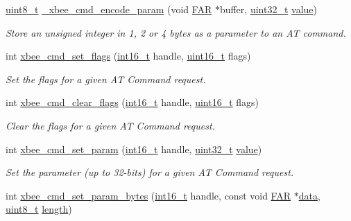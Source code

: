 \begin{DoxyCompactItemize}
\hyperlink{group__hal_gae1affc9ca37cfb624959c866a73f83c2}{uint8\-\_\-t} \hyperlink{group__xbee__atcmd_ga484572705b9695ab429fd51188f74238}{\-\_\-xbee\-\_\-cmd\-\_\-encode\-\_\-param} (void \hyperlink{group__hal_gaef060b3456fdcc093a7210a762d5f2ed}{F\-A\-R} $\ast$buffer, \hyperlink{group__hal__dos_ga09a1e304d66d35dd47daffee9731edaa}{uint32\-\_\-t} \hyperlink{group__zcl_ga1ed5b151a90f7e99af8cca2e6875ddf4}{value})
\begin{DoxyCompactList}\small\item\em Store an unsigned integer in 1, 2 or 4 bytes as a parameter to an A\-T command. \end{DoxyCompactList}\item 
int \hyperlink{group__xbee__atcmd_gad2cc44803cc53ada37df4557313e120b}{xbee\-\_\-cmd\-\_\-set\-\_\-flags} (\hyperlink{group__hal_ga2140805d08462d474b82ddc8d1c2f3e6}{int16\-\_\-t} handle, \hyperlink{group__hal_ga5a8b2dc9e45a9ee81a94ef304fb62505}{uint16\-\_\-t} flags)
\begin{DoxyCompactList}\small\item\em Set the flags for a given A\-T Command request. \end{DoxyCompactList}\item 
int \hyperlink{group__xbee__atcmd_ga0828601d6b2735ee9f2ebf408d12c05c}{xbee\-\_\-cmd\-\_\-clear\-\_\-flags} (\hyperlink{group__hal_ga2140805d08462d474b82ddc8d1c2f3e6}{int16\-\_\-t} handle, \hyperlink{group__hal_ga5a8b2dc9e45a9ee81a94ef304fb62505}{uint16\-\_\-t} flags)
\begin{DoxyCompactList}\small\item\em Clear the flags for a given A\-T Command request. \end{DoxyCompactList}\item 
int \hyperlink{group__xbee__atcmd_ga4295dde3673b07f41e569e333abd9730}{xbee\-\_\-cmd\-\_\-set\-\_\-param} (\hyperlink{group__hal_ga2140805d08462d474b82ddc8d1c2f3e6}{int16\-\_\-t} handle, \hyperlink{group__hal__dos_ga09a1e304d66d35dd47daffee9731edaa}{uint32\-\_\-t} \hyperlink{group__zcl_ga1ed5b151a90f7e99af8cca2e6875ddf4}{value})
\begin{DoxyCompactList}\small\item\em Set the parameter (up to 32-\/bits) for a given A\-T Command request. \end{DoxyCompactList}\item 
int \hyperlink{group__xbee__atcmd_ga6bd558a2d03eafe29b176f598d76ffd6}{xbee\-\_\-cmd\-\_\-set\-\_\-param\-\_\-bytes} (\hyperlink{group__hal_ga2140805d08462d474b82ddc8d1c2f3e6}{int16\-\_\-t} handle, const void \hyperlink{group__hal_gaef060b3456fdcc093a7210a762d5f2ed}{F\-A\-R} $\ast$\hyperlink{group__xbee__io_gac5955aa1e44ff234e6d78a19cf68f25c}{data}, \hyperlink{group__hal_gae1affc9ca37cfb624959c866a73f83c2}{uint8\-\_\-t} \hyperlink{group__zdo_gab2b3adeb2a67e656ff030b56727fd0ac}{length})

\end{DoxyCompactItemize}

